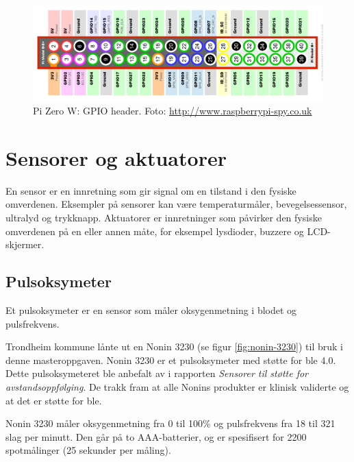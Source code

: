 \begin{figure}
\includegraphics[width=1.0\textwidth,center]{fig/pizero_gpio}
\caption{Pi Zero W: GPIO header. Foto: \url{http://www.raspberrypi-spy.co.uk}}
\label{fig:pizero_gpio}
\end{figure}

\section{Sensorer og aktuatorer}
En sensor er en innretning som gir signal om en tilstand i den fysiske omverdenen. Eksempler
på sensorer kan være temperaturmåler, bevegelsessensor, ultralyd og trykknapp. Aktuatorer er innretninger som påvirker
den fysiske omverdenen på en eller annen måte, for eksempel lysdioder, buzzere og LCD-skjermer.

\subsection{Pulsoksymeter}
Et pulsoksymeter er en sensor som måler oksygenmetning i blodet og pulsfrekvens.

Trondheim kommune lånte ut en Nonin 3230 (se figur \ref{fig:nonin-3230}) til bruk i denne masteroppgaven.
Nonin 3230 er et pulsoksymeter med støtte for \gls{ble} 4.0. Dette pulsoksymeteret ble anbefalt av \citet{austad2016sensorer}
i rapporten \textit{Sensorer til støtte for avstandsoppfølging}. De trakk fram at alle Nonins produkter
er klinisk validerte og at det er støtte for \gls{ble}.

Nonin 3230 måler oksygenmetning fra 0 til 100\% og pulsfrekvens fra 18 til 321 slag per minutt. Den går på to
AAA-batterier, og er spesifisert for 2200 spotmålinger (25 sekunder per måling).

